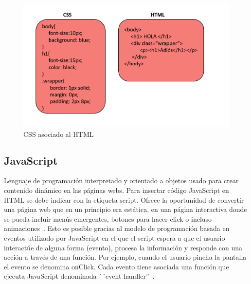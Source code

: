 \documentclass[a4paper, 12pt]{book}
\begin{document}
\begin{figure}[h]
        \centering
        \includegraphics[scale=0.4]{img/cssyhtml.PNG}
        \caption{CSS asociado al HTML}
        \label{figura:css}
\end{figure}

\subsection{JavaScript}
Lenguaje de programación interpretado y orientado a objetos usado para crear contenido dinámico en las páginas webs. Para insertar código JavaScript en HTML se debe indicar con la etiqueta script. Ofrece la oportunidad de convertir una página web que en un principio era estática, en una página interactiva donde se pueda incluir menús emergentes, botones para hacer click o incluso animaciones~\cite{mdn1}. Esto es posible gracias al modelo de programación basada en eventos utilizado por JavaScript en el que el script espera a que el usuario interactúe de alguna forma (evento), procesa la información y responde con una acción a través de una función. Por ejemplo, cuando el usuario pincha la pantalla el evento se denomina onClick. Cada evento tiene asociada una función que ejecuta JavaScript denominada ´´event handler''~\cite{perez2019introduccion}.
\end{document}
